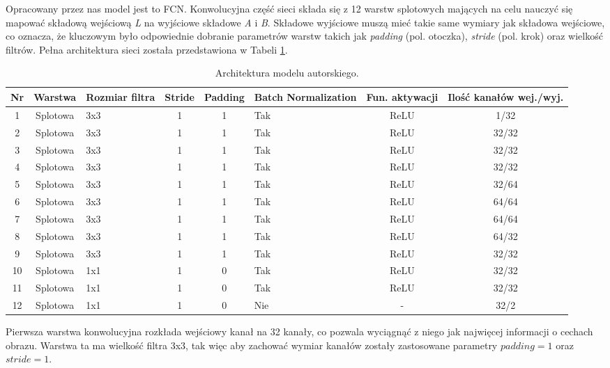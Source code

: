   Opracowany przez nas model jest to FCN. Konwolucyjna część sieci składa się
  z 12 warstw splotowych
  mających na celu nauczyć się mapować składową wejściową \textit{L} na wyjściowe
  składowe \textit{A} i \textit{B}. Składowe wyjściowe muszą mieć takie same
  wymiary jak składowa wejściowe, co oznacza, że kluczowym było odpowiednie dobranie
  parametrów warstw takich jak \textit{padding} (pol. otoczka), \textit{stride}
  (pol. krok) oraz wielkość filtrów. Pełna architektura sieci została przedstawiona w
  Tabeli \ref{table:model_architecture}.
  \noindent\begin{table}[H]
    \center
    \begin{tabular}{|c | c | m{3.3em} | c | c | m{4em} | c | c| }
     \hline
     Nr & Warstwa & Rozmiar filtra & Stride & Padding & Batch Normalization &
     Fun. aktywacji & Ilość kanałów wej./wyj. \\ [0.5ex]
    \hline
    1 & Splotowa & 3x3 & 1 & 1 & Tak & ReLU & 1/32 \\ \hline
    2 & Splotowa & 3x3 & 1 & 1 & Tak & ReLU & 32/32 \\ \hline
    3 & Splotowa & 3x3 & 1 & 1 & Tak & ReLU & 32/32 \\ \hline
    4 & Splotowa & 3x3 & 1 & 1 & Tak & ReLU & 32/32 \\ \hline
    5 & Splotowa & 3x3 & 1 & 1 & Tak & ReLU & 32/64 \\ \hline
    6 & Splotowa & 3x3 & 1 & 1 & Tak & ReLU & 64/64 \\ \hline
    7 & Splotowa & 3x3 & 1 & 1 & Tak & ReLU & 64/64 \\ \hline
    8 & Splotowa & 3x3 & 1 & 1 & Tak & ReLU & 64/32 \\ \hline
    9 & Splotowa & 3x3 & 1 & 1 & Tak & ReLU & 32/32 \\ \hline
    10 & Splotowa & 1x1 & 1 & 0 & Tak & ReLU & 32/32 \\ \hline
    11 & Splotowa & 1x1 & 1 & 0 & Tak & ReLU & 32/32 \\ \hline
    12 & Splotowa & 1x1 & 1 & 0 & Nie & - & 32/2 \\ \hline
    \end{tabular}
    \caption{Architektura modelu autorskiego.}
    \label{table:model_architecture}
  \end{table}
  Pierwsza warstwa konwolucyjna rozkłada wejściowy kanał na 32 kanały, co
  pozwala wyciągnąć z niego jak najwięcej informacji o cechach obrazu. Warstwa
  ta ma wielkość filtra 3x3, tak więc aby zachować wymiar kanałów zostały
  zastosowane parametry $\textit{padding}=1$ oraz $\textit{stride}=1$.

